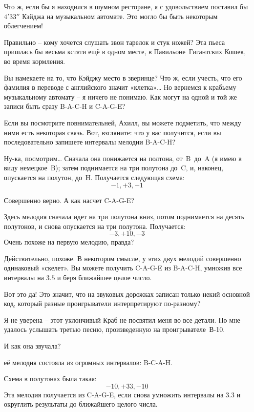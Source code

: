 \documentclass[../main.tex]{subfiles}
\begin{document}
\begin{dialogue}
 Что ж, если бы я находился в шумном ресторане, я с удовольствием поставил бы $4'33''$ Кэйджа на музыкальном автомате. Это могло бы быть некоторым облегчением!

 Правильно \--- кому хочется слушать звон тарелок и стук ножей? Эта пьеса пришлась бы весьма кстати ещё в одном месте, в Павильоне~Гигантских Кошек, во время кормления.

 Вы намекаете на то, что Кэйджу место в зверинце? Что ж, если учесть, что его фамилия в переводе с английского значит «клетка»\ldots{} Но вернемся к крабьему музыкальному автомату \--- я ничего не понимаю. Как могут на одной и той же записи быть сразу \mbox{B-A-C-H} и \mbox{C-A-G-E}?

 Если вы посмотрите повнимательней, Ахилл, вы можете подметить, что между ними есть некоторая связь. Вот, взгляните: что у вас получится, если вы последовательно запишете интервалы мелодии \mbox{B-A-C-H}?

 Ну-ка, посмотрим\ldots{} Сначала она понижается на полтона, от~B~до~A (я имею в виду немецкое~B); затем поднимается на три полутона до~C, и, наконец, опускается на полутон, до~H. Получается следующая схема:
\[
    -1, +3, -1
\]

 Совершенно верно. А как насчет \mbox{C-A-G-E}?

 Здесь мелодия сначала идет на три полутона вниз, потом поднимается на десять полутонов, и снова опускается на три полутона. Получается:
\[
    -3, +10, -3
\]
Очень похоже на первую мелодию, правда?

 Действительно, похоже. В некотором смысле, у этих двух мелодий совершенно одинаковый «скелет». Вы можете получить \mbox{C-A-G-E} из \mbox{B-A-C-H}, умножив все интервалы на $3.5$ и беря ближайшее целое число.

 Вот это да! Это значит, что на звуковых дорожках записан только некий основной код, который разные проигрыватели интерпретируют по-разному?

 Я не уверена \--- этот уклончивый Краб не посвятил меня во все детали. Но мне удалось услышать третью песню, произведенную на проигрывателе~\mbox{В-10}.

 И как она звучала?

 её мелодия состояла из огромных интервалов: \mbox{B-C-A-H}.

Схема в полутонах была такая:
\[
    -10, +33, -10
\]
Эта мелодия получается из \mbox{C-A-G-E}, если снова умножить интервалы на $3.3$ и округлить результаты до ближайшего целого числа.


\end{dialogue}
\end{document}
